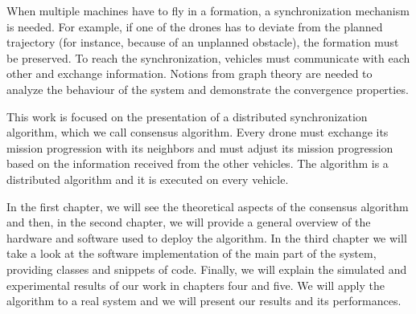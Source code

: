 When multiple machines have to fly in a formation, a synchronization mechanism is
needed. For example, if one of the drones has to deviate from the planned trajectory
(for instance, because of an unplanned obstacle), the formation must be preserved.
To reach the synchronization, vehicles must communicate with each other and
exchange information.
Notions from graph theory are needed to analyze the behaviour of the system
and demonstrate the convergence properties.

This work is focused on the presentation of a distributed synchronization algorithm,
which we call consensus algorithm. Every drone must exchange its mission progression
with its neighbors and must adjust its mission progression based on the information
received from the other vehicles.
The algorithm is a distributed algorithm and it is executed on every vehicle.


In the first chapter, we will see the theoretical aspects of the consensus algorithm and then,
in the second chapter, we will provide a general overview of the hardware and software used to deploy the algorithm.
In the third chapter we will take a look at the software implementation of the main part of the
system, providing classes and snippets of code.
Finally, we will explain the simulated and experimental results of our work
in chapters four and five.
We will apply the algorithm to a real system and we will present our results and its
performances.
